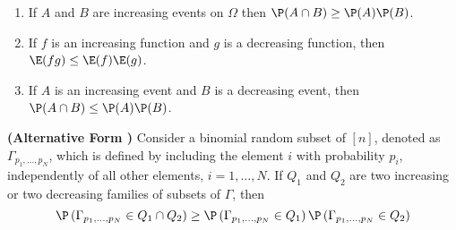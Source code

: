 \documentclass{article}
\newcommand{\bfs}[1]{\textbf{({#1})}}
\begin{document}
\begin{cora}\label{corafkg}\quad 

\begin{enumerate}
    \item If $A$ and $B$ are increasing events on $\Omega$ then $\P(A \cap B) \geq \P(A) \P(B)$.
    \item If $f$ is an increasing function and $g$ is a decreasing function, then $\E(f g) \leq \E(f) \E(g)$.
    \item If $A$ is an increasing event and $B$ is a decreasing event, then $\P(A \cap B) \leq \P(A) \P(B)$.
\end{enumerate}
\end{cora}
\begin{rema}{\bfs{Alternative Form }}
Consider a binomial random subset of $[n]$, denoted as $\Gamma_{p_{1}, \ldots, p_{N}}$, which is defined by including the element $i$ with probability $p_{i}$, independently of all other elements, $i=1, \ldots, N$. If $Q _{1}$ and $Q _{2}$ are two increasing or two decreasing families of subsets of $\Gamma$, then
$$
\P \left(\Gamma_{p_{1}, \ldots, p_{N}} \in Q _{1} \cap Q _{2}\right) \geq \P \left(\Gamma_{p_{1}, \ldots, p_{N}} \in Q _{1}\right) \P \left(\Gamma_{p_{1}, \ldots, p_{N}} \in Q _{2}\right)
$$
\end{rema}
\end{document}
